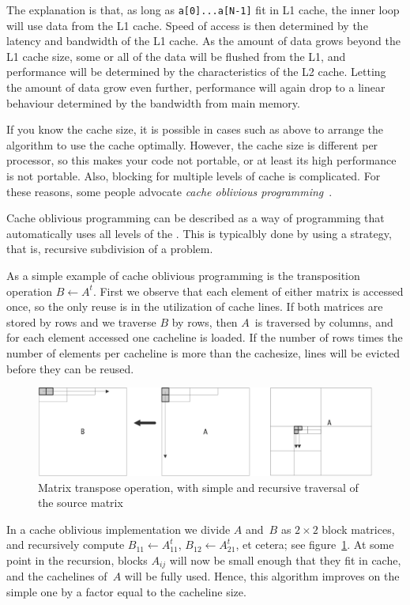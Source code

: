 The explanation is that,
as long as \texttt{a[0]...a[N-1]} fit in L1 cache, the inner loop will
use data from the L1 cache. Speed of access is then determined by the
latency and bandwidth of the L1 cache.
As the amount of data grows beyond the L1 cache size, some or all of
the data will be flushed from the L1, and performance will be determined by
the characteristics of the L2 cache. Letting the amount of data grow
even further, performance will again drop to a linear behaviour
determined by the bandwidth from main memory.


If you know the cache size, it is possible in cases such as above to
arrange the algorithm to use the cache optimally. However, the cache
size is different per processor, so this makes your code not portable,
or at least its high performance is not portable. Also, blocking for
multiple levels of cache is complicated. For these reasons, some
people advocate \emph{cache oblivious
  programming}~\cite{Frigo:oblivious}. 

Cache oblivious programming can be described as a way of programming
that automatically uses all levels of the
. This is typicalbly done by using a
 strategy, that is, recursive
subdivision of a problem.

As a simple example of cache oblivious programming is the 
{transposition} operation $B\leftarrow A^t$. First we observe that each
element of either matrix is accessed once, so the only reuse is in the
utilization of cache lines. If both matrices are stored by
rows and we traverse $B$ by rows, then $A$~is traversed by columns,
and for each element accessed one cacheline is loaded. If the number
of rows times the number of elements per cacheline is more than the
cachesize, lines will be evicted before they can be reused.

\begin{figure}[ht]
  \includegraphics[scale=.1]{graphics/oblivious1}
  \caption{Matrix transpose operation, with simple and recursive
    traversal of the source matrix}
  \label{fig:oblivious-transpose}
\end{figure}
In a cache oblivious implementation we divide $A$ and~$B$ as
$2\times2$ block matrices, and recursively compute $B_{11}\leftarrow
A_{11}^t$, $B_{12}\leftarrow A_{21}^t$, et cetera; see
figure~\ref{fig:oblivious-transpose}. At some point in the recursion,
blocks $A_{ij}$ will now be small enough that they fit in cache, and
the cachelines of~$A$ will be fully used. Hence, this algorithm
improves on the simple one by a factor equal to the cacheline size.

